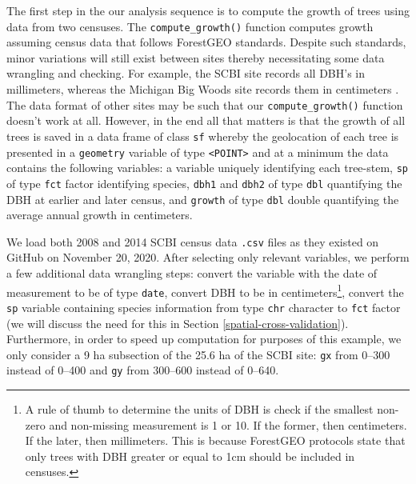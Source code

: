 \documentclass[12pt]{article}
\begin{document}
The first step in the our analysis sequence is to compute the growth of
trees using data from two censuses. The \texttt{compute\_growth()}
function computes growth assuming census data that follows ForestGEO
standards. Despite such standards, minor variations will still exist
between sites thereby necessitating some data wrangling and checking.
For example, the SCBI site records all DBH's in millimeters, whereas the
Michigan Big Woods site records them in centimeters
\citet{andersonteixeira_ctfs-forestgeo_2015}
\citet{allen_michigan_2020}. The data format of other sites may be such
that our \texttt{compute\_growth()} function doesn't work at all.
However, in the end all that matters is that the growth of all trees is
saved in a data frame of class \texttt{sf} whereby the geolocation of
each tree is presented in a \texttt{geometry} variable of type
\texttt{\textless{}POINT\textgreater{}} and at a minimum the data
contains the following variables: a variable uniquely identifying each
tree-stem, \texttt{sp} of type \texttt{fct} factor identifying species,
\texttt{dbh1} and \texttt{dbh2} of type \texttt{dbl} quantifying the DBH
at earlier and later census, and \texttt{growth} of type \texttt{dbl}
double quantifying the average annual growth in centimeters.

We load both 2008 and 2014 SCBI census data \texttt{.csv} files as they
existed on GitHub on November 20, 2020. After selecting only relevant
variables, we perform a few additional data wrangling steps: convert the
variable with the date of measurement to be of type \texttt{date},
convert DBH to be in centimeters\footnote{A rule of thumb to determine
  the units of DBH is check if the smallest non-zero and non-missing
  measurement is 1 or 10. If the former, then centimeters. If the later,
  then millimeters. This is because ForestGEO protocols state that only
  trees with DBH greater or equal to 1cm should be included in censuses.},
convert the \texttt{sp} variable containing species information from
type \texttt{chr} character to \texttt{fct} factor (we will discuss the
need for this in Section \ref{spatial-cross-validation}). Furthermore,
in order to speed up computation for purposes of this example, we only
consider a 9 ha subsection of the 25.6 ha of the SCBI site: \texttt{gx}
from 0--300 instead of 0--400 and \texttt{gy} from 300--600 instead of
0--640.
\end{document}
